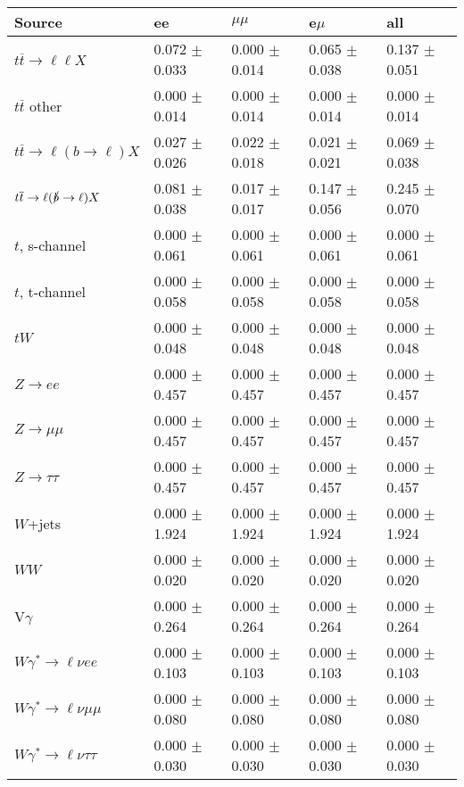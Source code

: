 \begin{tabular}{l | l l l l}
\hline\hline
 Source  &  ee  &  $\mu\mu$  &  e$\mu$  &  all \\
\hline
$t\overline{t}\rightarrow \ell\ell X$ &  0.072 $\pm$  0.033 &  0.000 $\pm$  0.014 &  0.065 $\pm$  0.038 &  0.137 $\pm$  0.051\\
$t\overline{t}$ other &  0.000 $\pm$  0.014 &  0.000 $\pm$  0.014 &  0.000 $\pm$  0.014 &  0.000 $\pm$  0.014\\
$t\overline{t}\rightarrow \ell(b\rightarrow \ell)X$ &  0.027 $\pm$  0.026 &  0.022 $\pm$  0.018 &  0.021 $\pm$  0.021 &  0.069 $\pm$  0.038\\
$t\overline{t}\rightarrow \ell(\slashed{b}\rightarrow \ell)X$ &  0.081 $\pm$  0.038 &  0.017 $\pm$  0.017 &  0.147 $\pm$  0.056 &  0.245 $\pm$  0.070\\
\hline
$t$, s-channel &  0.000 $\pm$  0.061 &  0.000 $\pm$  0.061 &  0.000 $\pm$  0.061 &  0.000 $\pm$  0.061\\
$t$, t-channel &  0.000 $\pm$  0.058 &  0.000 $\pm$  0.058 &  0.000 $\pm$  0.058 &  0.000 $\pm$  0.058\\
$tW$ &  0.000 $\pm$  0.048 &  0.000 $\pm$  0.048 &  0.000 $\pm$  0.048 &  0.000 $\pm$  0.048\\
\hline
$Z\rightarrow ee$ &  0.000 $\pm$  0.457 &  0.000 $\pm$  0.457 &  0.000 $\pm$  0.457 &  0.000 $\pm$  0.457\\
$Z\rightarrow\mu\mu$ &  0.000 $\pm$  0.457 &  0.000 $\pm$  0.457 &  0.000 $\pm$  0.457 &  0.000 $\pm$  0.457\\
$Z\rightarrow\tau\tau$ &  0.000 $\pm$  0.457 &  0.000 $\pm$  0.457 &  0.000 $\pm$  0.457 &  0.000 $\pm$  0.457\\
$W$+jets &  0.000 $\pm$  1.924 &  0.000 $\pm$  1.924 &  0.000 $\pm$  1.924 &  0.000 $\pm$  1.924\\
$WW$ &  0.000 $\pm$  0.020 &  0.000 $\pm$  0.020 &  0.000 $\pm$  0.020 &  0.000 $\pm$  0.020\\
\hline
V$\gamma$ &  0.000 $\pm$  0.264 &  0.000 $\pm$  0.264 &  0.000 $\pm$  0.264 &  0.000 $\pm$  0.264\\
$W\gamma^{*}\rightarrow\ell\nu e e$ &  0.000 $\pm$  0.103 &  0.000 $\pm$  0.103 &  0.000 $\pm$  0.103 &  0.000 $\pm$  0.103\\
$W\gamma^{*}\rightarrow\ell\nu\mu\mu$ &  0.000 $\pm$  0.080 &  0.000 $\pm$  0.080 &  0.000 $\pm$  0.080 &  0.000 $\pm$  0.080\\
$W\gamma^{*}\rightarrow\ell\nu\tau\tau$ &  0.000 $\pm$  0.030 &  0.000 $\pm$  0.030 &  0.000 $\pm$  0.030 &  0.000 $\pm$  0.030\\

\end{tabular}
